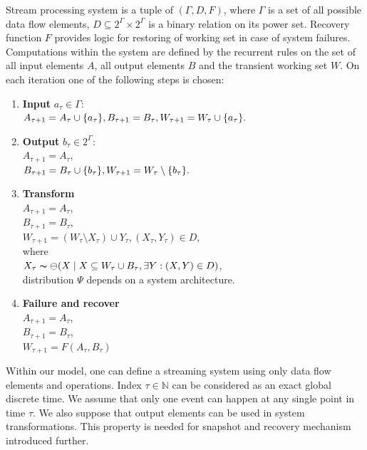 \begin{definition}{Stream processing system}
\label{reference_system}
is a tuple of $(\Gamma,D,F)$, where $\Gamma$ is a set of all possible data flow elements, $D\subseteq{2^{\Gamma}\times2^{\Gamma}}$ is a binary relation on its power set. Recovery function $F$ provides logic for restoring of working set in case of system failures. Computations within the system are defined by the recurrent rules on the set of all input elements $A$, all output elements $B$ and the transient working set $W$. On each iteration one of the following steps is chosen:

\begin{enumerate}
    \item \textbf{Input} $a_\tau\in{\Gamma}$:\\ $A_{\tau+1}=A_\tau \cup \{a_\tau\}, \\ B_{\tau+1}=B_{\tau}, \\ W_{\tau+1}=W_{\tau} \cup \{a_\tau\}.$
    \item \textbf{Output} $b_\tau\in{2^\Gamma}$:\\ $A_{\tau + 1} = A_{\tau}$, \\ $B_{\tau+1}=B_\tau \cup \{b_\tau\}, \\ W_{\tau+1}=W_{\tau} \setminus \{b_\tau\}.$
    \item \textbf{Transform}\\ $A_{\tau + 1} = A_{\tau}$,\\ $B_{\tau+1}=B_{\tau}$, \\ $W_{\tau+1}=(W_\tau \setminus X_\tau) \cup Y_\tau, (X_\tau,Y_\tau) \in D$, \\where\\$X_\tau \thicksim \mathcal{\Psi}(X\mid X \subseteq W_\tau \cup B_\tau , \exists Y : (X,Y) \in D)$, \\ distribution $\mathcal{\Psi}$ depends on a system architecture. \label{random_formula}
    \item \textbf{Failure and recover} \\  $A_{\tau + 1} = A_{\tau}$,\\ $B_{\tau+1}=B_{\tau}$, \\ $W_{\tau+1} = F(A_\tau,B_\tau)$
\end{enumerate}

\end{definition}

Within our model, one can define a streaming system using only data flow elements and operations. Index $\tau\in{\mathbb{N}}$ can be considered as an exact global discrete time. We assume that only one event can happen at any single point in time $\tau$. We also suppose that output elements can be used in system transformations. This property is needed for snapshot and recovery mechanism introduced further. 

